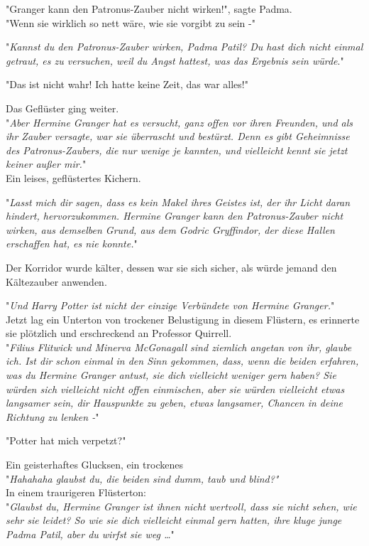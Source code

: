 {"Granger kann den Patronus-Zauber nicht wirken!", sagte Padma.\\ "Wenn sie wirklich so nett wäre, wie sie vorgibt zu sein -"

"\emph{Kannst du den Patronus-Zauber wirken, Padma Patil? Du hast dich nicht einmal getraut, es zu versuchen, weil du Angst hattest, was das Ergebnis sein würde}."

"Das ist nicht wahr! Ich hatte keine Zeit, das war alles!"

Das Geflüster ging weiter.\\ "\emph{Aber Hermine Granger hat es versucht, ganz offen vor ihren Freunden, und als ihr Zauber versagte, war sie überrascht und bestürzt. Denn es gibt Geheimnisse des Patronus-Zaubers, die nur wenige je kannten, und vielleicht kennt sie jetzt keiner außer mir.}"\\ Ein leises, geflüstertes Kichern.

"\emph{Lasst mich dir sagen, dass es kein Makel ihres Geistes ist, der ihr Licht daran hindert, hervorzukommen. Hermine Granger kann den Patronus-Zauber nicht wirken, aus demselben Grund, aus dem Godric Gryffindor, der diese Hallen erschaffen hat, es nie konnte.}"

Der Korridor wurde kälter, dessen war sie sich sicher, als würde jemand den Kältezauber anwenden.

"\emph{Und Harry Potter ist nicht der einzige Verbündete von Hermine Granger.}"\\ Jetzt lag ein Unterton von trockener Belustigung in diesem Flüstern, es erinnerte sie plötzlich und erschreckend an Professor Quirrell.\\ "\emph{Filius Flitwick und Minerva McGonagall sind ziemlich angetan von ihr, glaube ich. Ist dir schon einmal in den Sinn gekommen, dass, wenn die beiden erfahren, was du Hermine Granger antust, sie dich vielleicht weniger gern haben? Sie würden sich vielleicht nicht offen einmischen, aber sie würden vielleicht etwas langsamer sein, dir Hauspunkte zu geben, etwas langsamer, Chancen in deine Richtung zu lenken -}"

"Potter hat mich verpetzt?"

Ein geisterhaftes Glucksen, ein trockenes\\ "\emph{Hahahaha glaubst du, die beiden sind dumm, taub und blind?"}\\ In einem traurigeren Flüsterton:\\ "\emph{Glaubst du, Hermine Granger ist ihnen nicht wertvoll, dass sie nicht sehen, wie sehr sie leidet? So wie sie dich vielleicht einmal gern hatten, ihre kluge junge Padma Patil, aber du wirfst sie weg …}"

}
